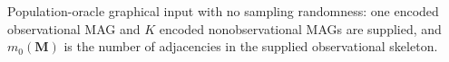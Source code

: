 Population-oracle graphical input with no sampling randomness: one encoded observational MAG and \(K\) encoded nonobservational MAGs are supplied, and \(m_0(\mathbf M)\) is the number of adjacencies in the supplied observational skeleton.